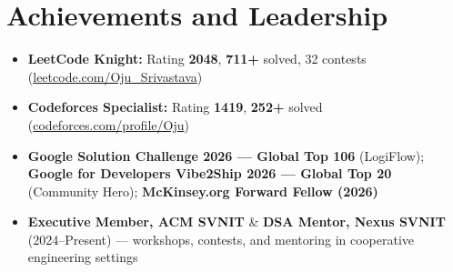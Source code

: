 \documentclass[a4paper,10pt]{article}
\begin{document}
\section{Achievements and Leadership}
\small
\begin{itemize}
  \item \textbf{LeetCode Knight:} Rating \textbf{2048}, \textbf{711+} solved, 32 contests (\href{https://leetcode.com/Oju_Srivastava}{leetcode.com/Oju\_Srivastava})
  \item \textbf{Codeforces Specialist:} Rating \textbf{1419}, \textbf{252+} solved (\href{https://codeforces.com/profile/Oju}{codeforces.com/profile/Oju})
  \item \textbf{Google Solution Challenge 2026 --- Global Top 106} (LogiFlow); \textbf{Google for Developers Vibe2Ship 2026 --- Global Top 20} (Community Hero); \textbf{McKinsey.org Forward Fellow (2026)}
  \item \textbf{Executive Member, ACM SVNIT} \& \textbf{DSA Mentor, Nexus SVNIT} (2024--Present) --- workshops, contests, and mentoring in cooperative engineering settings
\end{itemize}
\end{document}
